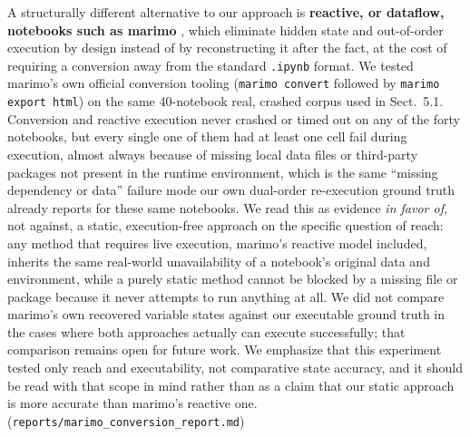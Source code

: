 \documentclass[11pt]{article}
\begin{document}
A structurally different alternative to our approach is
\textbf{reactive, or dataflow, notebooks such as marimo}
\citep{marimo}, which eliminate hidden state and out-of-order execution
by design instead of by reconstructing it after the fact, at the cost
of requiring a conversion away from the standard \texttt{.ipynb} format.
We tested marimo's own official conversion tooling
(\texttt{marimo convert} followed by \texttt{marimo export html}) on the
same 40-notebook real, crashed corpus used in Sect.~5.1. Conversion and
reactive execution never crashed or timed out on any of the forty
notebooks, but every single one of them had at least one cell fail
during execution, almost always because of missing local data files or
third-party packages not present in the runtime environment, which is
the same ``missing dependency or data'' failure mode our own dual-order
re-execution ground truth already reports for these same notebooks. We
read this as evidence \emph{in favor of}, not against, a static,
execution-free approach on the specific question of reach: any method
that requires live execution, marimo's reactive model included, inherits
the same real-world unavailability of a notebook's original data and
environment, while a purely static method cannot be blocked by a missing
file or package because it never attempts to run anything at all. We did
not compare marimo's own recovered variable states against our
executable ground truth in the cases where both approaches actually can
execute successfully; that comparison remains open for future work. We
emphasize that this experiment tested only reach and executability, not
comparative state accuracy, and it should be read with that scope in
mind rather than as a claim that our static approach is more accurate
than marimo's reactive one.
(\texttt{reports/marimo\_conversion\_report.md})
\end{document}
